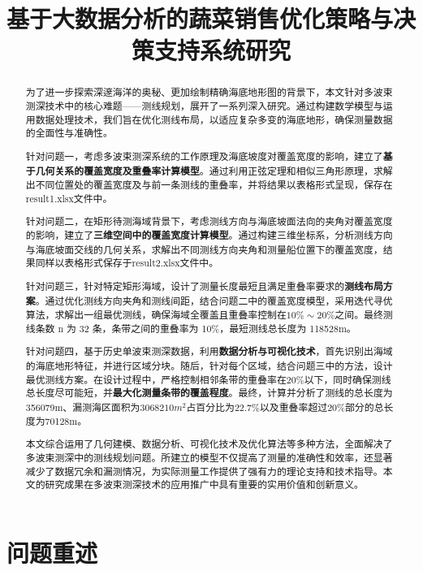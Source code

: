 \documentclass{cumcmthesis}
\title{基于大数据分析的蔬菜销售优化策略与决策支持系统研究}
\begin{document}
 \maketitle
 \begin{abstract}
 
为了进一步探索深邃海洋的奥秘、更加绘制精确海底地形图的背景下，本文针对多波束测深技术中的核心难题——测线规划，展开了一系列深入研究。通过构建数学模型与运用数据处理技术，我们旨在优化测线布局，以适应复杂多变的海底地形，确保测量数据的全面性与准确性。

针对问题一，考虑多波束测深系统的工作原理及海底坡度对覆盖宽度的影响，建立了\textbf{基于几何关系的覆盖宽度及重叠率计算模型}。通过利用正弦定理和相似三角形原理，求解出不同位置处的覆盖宽度及与前一条测线的重叠率，并将结果以表格形式呈现，保存在result1.xlsx文件中。

针对问题二，在矩形待测海域背景下，考虑测线方向与海底坡面法向的夹角对覆盖宽度的影响，建立了\textbf{三维空间中的覆盖宽度计算模型}。通过构建三维坐标系，分析测线方向与海底坡面交线的几何关系，求解出不同测线方向夹角和测量船位置下的覆盖宽度，结果同样以表格形式保存于result2.xlsx文件中。

针对问题三，针对特定矩形海域，设计了测量长度最短且满足重叠率要求的\textbf{测线布局方案}。通过优化测线方向夹角和测线间距，结合问题二中的覆盖宽度模型，采用迭代寻优算法，求解出一组最优测线，确保海域全覆盖且重叠率控制在$10\%\sim20\%$之间。最终测线条数 n 为 32 条，条带之间的重叠率为 10\%，最短测线总长度为 118528m。

针对问题四，基于历史单波束测深数据，利用\textbf{数据分析与可视化技术}，首先识别出海域的海底地形特征，并进行区域分块。随后，针对每个区域，结合问题三中的方法，设计最优测线方案。在设计过程中，严格控制相邻条带的重叠率在20\%以下，同时确保测线总长度尽可能短，并\textbf{最大化测量条带的覆盖程度}。最终，计算并分析了测线的总长度为356079m、漏测海区面积为$3068210m^2$占百分比为$22.7\%$以及重叠率超过20\%部分的总长度为70128m。

本文综合运用了几何建模、数据分析、可视化技术及优化算法等多种方法，全面解决了多波束测深中的测线规划问题。所建立的模型不仅提高了测量的准确性和效率，还显著减少了数据冗余和漏测情况，为实际测量工作提供了强有力的理论支持和技术指导。本文的研究成果在多波束测深技术的应用推广中具有重要的实用价值和创新意义。

\end{abstract}

\section{问题重述}
\end{document}
